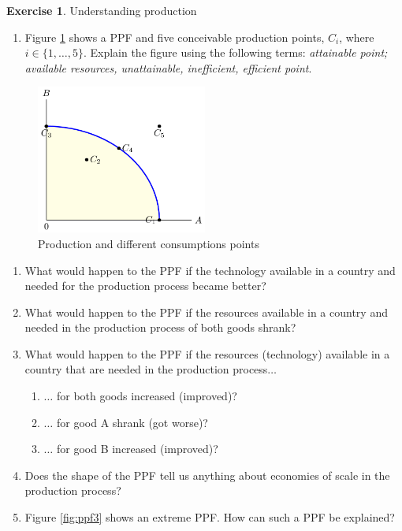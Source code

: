 \documentclass[
  12pt,
  oneside]{book}
\providecommand{\tightlist}{%
  \setlength{\itemsep}{0pt}\setlength{\parskip}{0pt}}
\theoremstyle{definition}
\theoremstyle{definition}
\theoremstyle{definition}
\newtheorem{exercise}{Exercise}[chapter]
\theoremstyle{definition}
\theoremstyle{remark}
\begin{document}
\begin{exercise}
\protect\hypertarget{exr:Uproduction}{}\label{exr:Uproduction}Understanding production

\begin{enumerate}
\def\labelenumi{\alph{enumi})}
\tightlist
\item
  Figure \ref{fig:ppf2} shows a PPF and five conceivable production points, \(C_i\), where \(i\in \{1,\dots,5\}\).
  Explain the figure using the following terms: \textit{attainable point; available resources, unattainable, inefficient, efficient point}.
\end{enumerate}

\begin{figure}
\centering
\includegraphics[width=0.5\textwidth,height=\textheight]{fig/ppf2.png}
\caption{\label{fig:ppf2} Production and different consumptions points}
\end{figure}

\begin{enumerate}
\def\labelenumi{\alph{enumi})}
\setcounter{enumi}{1}
\item
  What would happen to the PPF if the technology available in a country and needed for the production process became better?
\item
  What would happen to the PPF if the resources available in a country and needed in the production process of both goods shrank?
\item
  What would happen to the PPF if the resources (technology) available in a country that are needed in the production process\(\dots\)

  \begin{enumerate}
  \def\labelenumii{\roman{enumii})}
  \tightlist
  \item
    \(\dots\) for both goods increased (improved)?
  \item
    \(\dots\) for good A shrank (got worse)?
  \item
    \(\dots\) for good B increased (improved)?
  \end{enumerate}
\item
  Does the shape of the PPF tell us anything about economies of scale in the production process?
\item
  Figure \ref{fig:ppf3} shows an extreme PPF. How can such a PPF be explained?
\end{enumerate}


\end{exercise}
\end{document}
